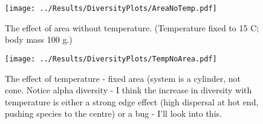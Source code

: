 \documentclass[11pt]{article}
\begin{document}
\newpage
\begin{figure}
\vspace*{-7cm}

	\texttt{[image: ../Results/DiversityPlots/AreaNoTemp.pdf]}
	\caption{The effect of area without temperature. (Temperature fixed to 15 \degree C; body mass 100 g.)}

\end{figure}


\newpage
\begin{figure}
\vspace*{-7cm}

	\texttt{[image: ../Results/DiversityPlots/TempNoArea.pdf]}
	\caption{The effect of temperature - fixed area (system is a cylinder, not cone. Notice alpha diversity - I think the increase in diversity with temperature is either a strong edge effect (high dispersal at hot end, pushing species to the centre) or a bug - I'll look into this.
}

\end{figure}
\end{document}
